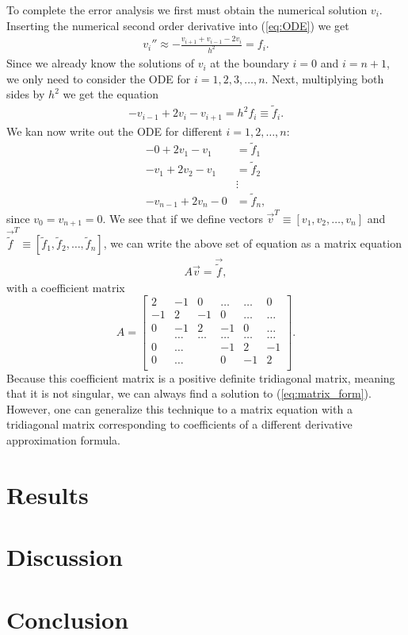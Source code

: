 \documentclass[twocolumn]{aastex62}
\begin{document}
To complete the error analysis we first must obtain the numerical solution $v_i$. Inserting the numerical second order derivative into (\ref{eq:ODE}) we get 
\begin{align}
	v_i''\approx -\frac{v_{i+1} + v_{i-1} - 2v_i}{h^2} = f_i.
\end{align}
Since we already know the solutions of $v_i$ at the boundary $i = 0$ and $i = n+1$, we only need to consider the ODE for $i = 1, 2, 3, \ldots, n$.
Next, multiplying both sides by $h^2$ we get the equation
\begin{align}
	-v_{i-1}  + 2v_i - v_{i+1} = h^2f_i\equiv \tilde{f}_i.
\end{align}
We kan now write out the ODE for different $i = 1, 2, \ldots, n$: 
\begin{align*}
	-0 + 2v_1 - v_1 &= \tilde{f}_1\\
	-v_1 + 2v_2 - v_1 &= \tilde{f}_2\\
	&\vdots\\
	-v_{n-1} + 2v_n - 0 &= \tilde{f}_n,
\end{align*}
since $v_0 = v_{n+1} = 0$. We see that if we define vectors $\vec{v}^T \equiv [v_1, v_2, \ldots, v_n]$ and $\vec{\tilde{f}}^T \equiv [\tilde{f}_1, \tilde{f}_2, \ldots, \tilde{f}_n]$, we can write the above set of equation as a matrix equation 
\begin{align}
	A\vec{v} =  \vec{\tilde{f}}, 
	\label{eq:matrix_form}
\end{align}
with a coefficient matrix 
\[ A = 
\begin{bmatrix}
	2& -1& 0 &\dots   & \dots &0 \\
	-1 & 2 & -1 &0 &\dots &\dots \\
    0&-1 &2 & -1 & 0 & \dots \\
    & \dots   & \dots &\dots   &\dots & \dots \\
    0&\dots   &  &-1 &2& -1 \\
    0&\dots    &  & 0  &-1 & 2 \\
\end{bmatrix}.
\]
Because this coefficient matrix is a positive definite tridiagonal matrix, meaning that it is not singular, we can always find a solution to (\ref{eq:matrix_form}). However, one can generalize this technique to a matrix equation with a tridiagonal matrix corresponding to coefficients of a different derivative approximation formula.


\section{Results} \label{sec:results}

\section{Discussion} \label{sec:discussion}

\section{Conclusion} \label{sec:conclusion}

\
\end{document}
